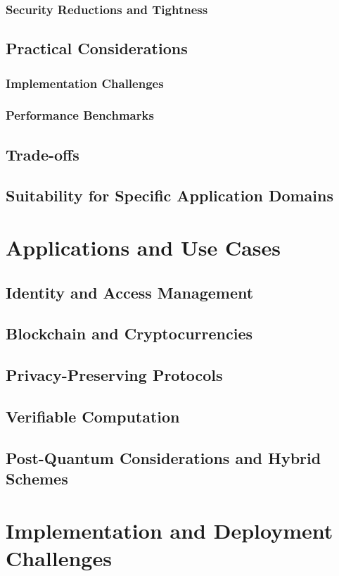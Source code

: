 \documentclass{iacrcc}
\begin{document}
\subsubsection{Security Reductions and Tightness}
\subsection{Practical Considerations}
\subsubsection{Implementation Challenges}
\subsubsection{Performance Benchmarks}
\subsection{Trade-offs}
\subsection{Suitability for Specific Application Domains}

\section{Applications and Use Cases}
\subsection{Identity and Access Management}
\subsection{Blockchain and Cryptocurrencies}
\subsection{Privacy-Preserving Protocols}
\subsection{Verifiable Computation}
\subsection{Post-Quantum Considerations and Hybrid Schemes}

\section{Implementation and Deployment Challenges}
\end{document}
